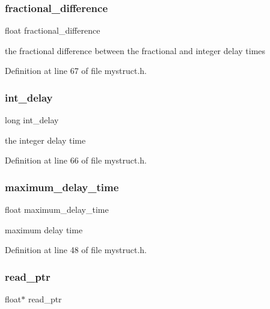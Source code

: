 \subsubsection{\texorpdfstring{fractional\+\_\+difference}{fractional\_difference}}
{\footnotesize\ttfamily float fractional\+\_\+difference}

the fractional difference between the fractional and integer delay times 

Definition at line 67 of file mystruct.\+h.

\mbox{\label{struct__delaylama_aee4739857c84c525e1cc4bde2109fed9}} 
\subsubsection{\texorpdfstring{int\+\_\+delay}{int\_delay}}
{\footnotesize\ttfamily long int\+\_\+delay}

the integer delay time 

Definition at line 66 of file mystruct.\+h.

\mbox{\label{struct__delaylama_a8ba3bc6edcb6cd4f1f2df78776585103}} 
\subsubsection{\texorpdfstring{maximum\+\_\+delay\+\_\+time}{maximum\_delay\_time}}
{\footnotesize\ttfamily float maximum\+\_\+delay\+\_\+time}

maximum delay time 

Definition at line 48 of file mystruct.\+h.

\mbox{\label{struct__delaylama_a29e64edb7b6a1dd7dfb1532de8fdd3c5}} 
\subsubsection{\texorpdfstring{read\+\_\+ptr}{read\_ptr}}
{\footnotesize\ttfamily float$\ast$ read\+\_\+ptr}

